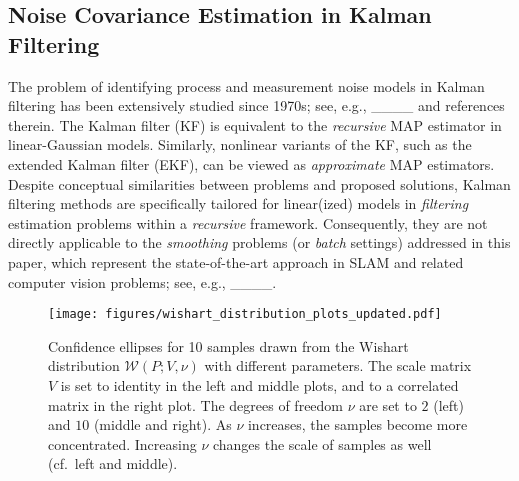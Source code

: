 \subsection{Noise Covariance Estimation in Kalman Filtering}
The problem of identifying process and measurement noise models in Kalman
filtering has been extensively studied since 1970s; see, e.g.,
____ and references therein. The Kalman filter (KF) is
equivalent to the \emph{recursive} MAP estimator in linear-Gaussian models.
Similarly, nonlinear variants of the KF, such as the extended Kalman filter
(EKF), can be viewed as \emph{approximate} MAP estimators.  Despite conceptual
similarities between problems and proposed solutions, Kalman filtering methods
are specifically tailored for linear(ized) models in \emph{filtering} estimation
problems within a \emph{recursive} framework. Consequently, they are not
directly applicable to the \emph{smoothing} problems (or \emph{batch} settings)
addressed in this paper, which represent the state-of-the-art approach in SLAM
and related computer vision problems; see, e.g., ____.

\begin{figure}[t]
		\centering
		\texttt{[image: figures/wishart\_distribution\_plots\_updated.pdf]}
		\caption{Confidence ellipses for 10 samples drawn from the Wishart distribution 
				$\mathcal{W}(P;V,\nu)$ with different parameters. The scale matrix $V$ is set 
				to identity in the left and middle plots, and to a correlated matrix in the 
				right plot. The degrees of freedom $\nu$ are set to $2$ (left) and $10$ (middle and right). 
				As $\nu$ increases, the samples become more concentrated. Increasing $\nu$ changes the scale of samples as
well (cf.\ left and middle).}
		\label{fig:wishart}
\end{figure}